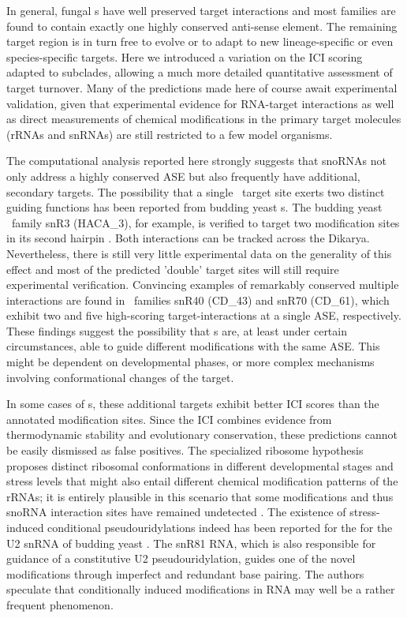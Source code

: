 In general, fungal \sno s have well preserved target interactions and
most families are found to contain exactly one highly conserved
anti-sense element. The remaining target region is in turn free to
evolve or to adapt to new lineage-specific or even species-specific
targets. Here we introduced a variation on the ICI scoring adapted to
subclades, allowing a much more detailed quantitative assessment of
target turnover. Many of the predictions made here of course await
experimental validation, given that experimental evidence for
RNA-target interactions as well as direct measurements of chemical
modifications in the primary target molecules (rRNAs and snRNAs) are
still restricted to a few model organisms.

The computational analysis reported here strongly suggests that
snoRNAs not only address a highly conserved ASE but also frequently
have additional, secondary targets. The possibility that a single
\sno\ target site exerts two distinct guiding functions has been
reported from budding yeast \haca s. The budding yeast \sno\ family
snR3 (HACA\_3), for example, is verified to target two modification
sites in its second hairpin \cite{Schattner:2004}.  Both interactions
can be tracked across the Dikarya.  Nevertheless, there is still very
little experimental data on the generality of this effect and most of
the predicted 'double' target sites will still require experimental
verification. Convincing examples of remarkably conserved multiple
interactions are found in \cd\ families snR40 (CD\_43) and snR70
(CD\_61), which exhibit two and five high-scoring target-interactions
at a single ASE, respectively.  These findings suggest the possibility
that \sno s are, at least under certain circumstances, able to guide
different modifications with the same ASE. This might be dependent on
developmental phases, or more complex mechanisms involving
conformational changes of the target.

In some cases of \haca s, these additional targets exhibit better ICI
scores than the annotated modification sites. Since the ICI combines
evidence from thermodynamic stability and evolutionary conservation, these
predictions cannot be easily dismissed as false positives. The specialized
ribosome hypothesis proposes distinct ribosomal conformations in different
developmental stages and stress levels that might also entail different
chemical modification patterns of the rRNAs; it is entirely plausible in
this scenario that some modifications and thus snoRNA interaction sites
have remained undetected \citep{Xue:2012}. The existence of
stress-induced conditional pseudouridylations indeed has been reported for
the for the U2 snRNA of budding yeast \cite{Wu:2011}. The snR81 RNA, which
is also responsible for guidance of a constitutive U2 pseudouridylation,
guides one of the novel modifications through imperfect and redundant base
pairing. The authors speculate that conditionally induced modifications in
RNA may well be a rather frequent phenomenon.

